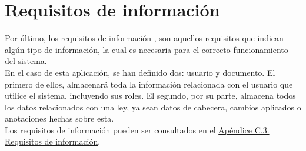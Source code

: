 \section{Requisitos de información}

Por último, los requisitos de información \cite{requisitos}, son aquellos requisitos que indican algún tipo de información, la cual es necesaria para el correcto funcionamiento del sistema.
\\

En el caso de esta aplicación, se han definido dos: usuario y documento. El primero de ellos, almacenará toda la información relacionada con el usuario que utilice el sistema, incluyendo sus roles. El segundo, por su parte, almacena todos los datos relacionados con una ley, ya sean datos de cabecera, cambios aplicados o anotaciones hechas sobre esta.
\\

Los requisitos de información pueden ser consultados en el \hyperref[APRequisitosInformacion]{Apéndice C.3. Requisitos de información}.